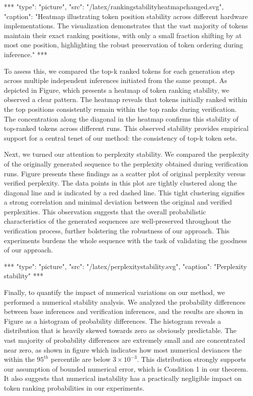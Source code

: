 \documentclass{article}
\begin{document}
\begin{center}
***
"type": "picture",
"src": "/latex/rankingstabilityheatmapchanged.svg",
"caption": "Heatmap illustrating token position stability across different hardware implementations. The visualization demonstrates that the vast majority of tokens maintain their exact ranking positions, with only a small fraction shifting by at most one position, highlighting the robust preservation of token ordering during inference."
***
\end{center}

To assess this, we compared the top-k ranked tokens for each generation step across multiple independent inferences initiated from the same prompt. As depicted in Figure, which presents a heatmap of token ranking stability, we observed a clear pattern. The heatmap reveals that tokens initially ranked within the top positions consistently remain within the top ranks during verification.  The concentration along the diagonal in the heatmap confirms this stability of top-ranked tokens across different runs. This observed stability provides empirical support for a central tenet of our method: the consistency of top-k token sets.

Next, we turned our attention to perplexity stability. We compared the perplexity of the originally generated sequence to the perplexity obtained during verification runs. Figure presents these findings as a scatter plot of original perplexity versus verified perplexity. The data points in this plot are tightly clustered along the diagonal line and is indicated by a red dashed line. This tight clustering signifies a strong correlation and minimal deviation between the original and verified perplexities. This observation suggests that the overall probabilistic characteristics of the generated sequences are well-preserved throughout the verification process, further bolstering the robustness of our approach.  This experiments burdens the whole sequence with the task of validating the goodness of our approach.

\begin{center}
***
"type": "picture",
"src": "/latex/perplexitystability.svg",
"caption": "Perplexity stability"
***
\end{center}

Finally, to quantify the impact of numerical variations on our method, we performed a numerical stability analysis.  We analyzed the probability differences between base inferences and verification inferences, and the results are shown in Figure as a histogram of probability differences. The histogram reveals a distribution that is heavily skewed towards zero as obviously predictable. The vast majority of probability differences are extremely small and are concentrated near zero, as shown in figure which indicates how most numerical deviances the within the $95^{th}$ percentile are below $3 \times 10^{-3}$. This distribution strongly supports our assumption of bounded numerical error, which is Condition 1 in our theorem. It also suggests that numerical instability has a practically negligible impact on token ranking probabilities in our experiments.
\end{document}
